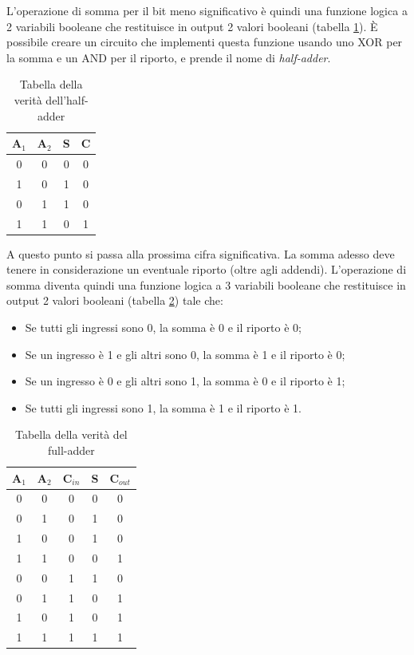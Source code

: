\documentclass{article}
\begin{document}
L'operazione di somma per il bit meno significativo è quindi una funzione logica a 2 variabili booleane che restituisce in output 2 valori booleani (tabella \ref{Tabella_half_adder}). È possibile creare un circuito che implementi questa funzione usando uno XOR per la somma e un AND per il riporto, e prende il nome di \textit{half-adder}.

\begin{table}[h]
  \centering
  \begin{tabular}{| c | c || c | c |}
  \hline
  A$_1$ & A$_2$ & S & C \\ \hline
  0 & 0 & 0 & 0 \\ \hline
  1 & 0 & 1 & 0 \\ \hline
  0 & 1 & 1 & 0 \\ \hline
  1 & 1 & 0 & 1 \\ \hline
  \end{tabular}
  \caption{Tabella della verità dell'half-adder}
  \label{Tabella_half_adder}
\end{table}

A questo punto si passa alla prossima cifra significativa. La somma adesso deve tenere in considerazione un eventuale riporto (oltre agli addendi). L'operazione di somma diventa quindi una funzione logica a 3 variabili booleane che restituisce in output 2 valori booleani (tabella \ref{Tabella_full_adder}) tale che:
\begin{itemize}
  \item [\textendash] Se tutti gli ingressi sono 0, la somma è 0 e il riporto è 0;
  \item [\textendash] Se un ingresso è 1 e gli altri sono 0, la somma è 1 e il riporto è 0;
  \item [\textendash] Se un ingresso è 0 e gli altri sono 1, la somma è 0 e il riporto è 1;
  \item [\textendash] Se tutti gli ingressi sono 1, la somma è 1 e il riporto è 1.
\end{itemize}

\begin{table}[h]
  \centering
  \begin{tabular}{| c | c | c || c | c |}
  \hline
  A$_1$ & A$_2$ & C$_{in}$ & S & C$_{out}$ \\ \hline
  0 & 0 & 0 & 0 & 0 \\ \hline
  0 & 1 & 0 & 1 & 0 \\ \hline
  1 & 0 & 0 & 1 & 0 \\ \hline
  1 & 1 & 0 & 0 & 1 \\ \hline
  0 & 0 & 1 & 1 & 0 \\ \hline
  0 & 1 & 1 & 0 & 1 \\ \hline
  1 & 0 & 1 & 0 & 1 \\ \hline
  1 & 1 & 1 & 1 & 1 \\ \hline
  \end{tabular}
  \caption{Tabella della verità del full-adder}
  \label{Tabella_full_adder}
\end{table}
\end{document}
